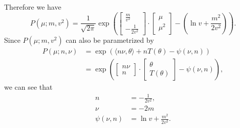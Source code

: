 \documentclass[12pt]{article}
\begin{document}
Therefore we have \[P\left( \mu;m,v^2 \right)=\frac{1}{\sqrt{2\pi}}\exp\left( \begin{bmatrix}
      \frac{m}{v^2} \\-\frac{1}{2v^2}
    \end{bmatrix}\cdot\begin{bmatrix}
      \mu \\\mu^2
    \end{bmatrix}-\left( \ln v+\frac{m^2}{2v^2} \right) \right).\]
Since $P(\mu;m,v^2)$ can also be parametrized by
\begin{align*}
  P(\mu;n,\nu) & =\exp\left( \langle n\nu,\theta\rangle+nT(\theta)-\psi(\nu,n) \right)                      \\
               & =\exp\left( \begin{bmatrix}
    n\nu \\n
  \end{bmatrix}\cdot\begin{bmatrix}
    \theta \\T(\theta)
  \end{bmatrix}-\psi(\nu,n) \right),
\end{align*} we can see that
\begin{align*}
  n           & =-\frac{1}{2v^2},         \\
  \nu         & =-2m                     \\
  \psi(\nu,n) & =\ln v+\frac{m^2}{2v^2}.
\end{align*}
\end{document}
